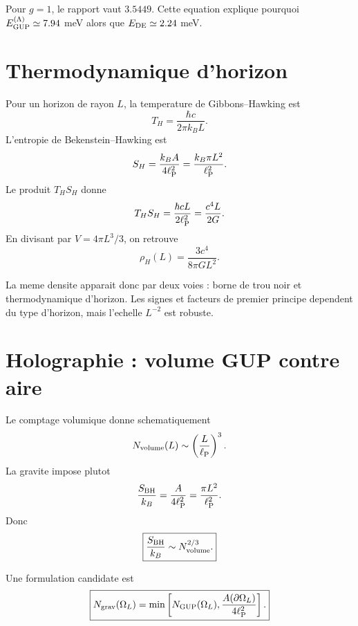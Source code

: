 \documentclass[11pt,a4paper]{article}
\newcommand{\lp}{\ell_{\rm P}}
\begin{document}
Pour $g=1$, le rapport vaut $3.5449$. Cette equation explique pourquoi
$E_{\rm GUP}^{(\Lambda)}\simeq7.94$ meV alors que
$E_{\rm DE}\simeq2.24$ meV.

\section{Thermodynamique d'horizon}

Pour un horizon de rayon $L$, la temperature de Gibbons--Hawking est
\begin{equation}
T_H=\frac{\hbar c}{2\pi k_B L}.
\end{equation}
L'entropie de Bekenstein--Hawking est
\begin{equation}
S_H=\frac{k_B A}{4\lp^2}
=\frac{k_B\pi L^2}{\lp^2}.
\end{equation}
Le produit $T_HS_H$ donne
\begin{equation}
T_HS_H
=
\frac{\hbar cL}{2\lp^2}
=
\frac{c^4L}{2G}.
\end{equation}
En divisant par $V=4\pi L^3/3$, on retrouve
\begin{equation}
\boxed{
\rho_H(L)=\frac{3c^4}{8\pi G L^2}.
}
\end{equation}

La meme densite apparait donc par deux voies : borne de trou noir et
thermodynamique d'horizon. Les signes et facteurs de premier principe dependent
du type d'horizon, mais l'echelle $L^{-2}$ est robuste.

\section{Holographie : volume GUP contre aire}

Le comptage volumique donne schematiquement
\begin{equation}
N_{\rm volume}(L)\sim\left(\frac{L}{\lp}\right)^3.
\end{equation}
La gravite impose plutot
\begin{equation}
\frac{S_{\rm BH}}{k_B}
=
\frac{A}{4\lp^2}
=
\frac{\pi L^2}{\lp^2}.
\end{equation}
Donc
\begin{equation}
\boxed{
\frac{S_{\rm BH}}{k_B}
\sim
N_{\rm volume}^{2/3}.
}
\end{equation}

Une formulation candidate est
\begin{equation}
\boxed{
N_{\rm grav}(\Omega_L)
=
\min\left[
N_{\rm GUP}(\Omega_L),
\frac{A(\partial\Omega_L)}{4\lp^2}
\right].
}
\end{equation}
\end{document}
